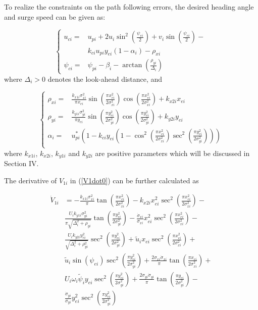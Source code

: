 \documentclass[conference,letterpaper,10.5pt]{IEEEtran}
\begin{document}
To realize the constraints on the path following errors, the desired heading angle and surge speed can be given as:

\begin{equation}\label{guidance law 1}
	\left\{
	\begin{aligned}
		u_{ci}=&u_{pi}+2u_i\sin^2(\frac{\psi_{ei}}{2})+v_i\sin(\frac{\psi_{ei}}{2})-\\
		&k_{ci}u_{pi}y_{ei}(1-\alpha_i)-\rho_{xi}\\
		\psi_{ci}=&\psi_{pi}-\beta_i-\arctan(\frac{\rho_{yi}}{\Delta_i})
	\end{aligned}
	\right.
\end{equation}
where $\Delta_i>0$ denotes the look-ahead distance, and 

\begin{equation}
	\left\{
	\begin{aligned}
		\rho_{xi}=&\frac{k_{x1i}\sigma^2_{xi}}{\pi x_{ei}}\sin(\frac{\pi x^2_{ei}}{2\sigma^2_{xi}})\cos(\frac{\pi x^2_{ei}}{2\sigma^2_{xi}})+k_{x2i}x_{ei}\\
		\rho_{yi}=&\frac{k_{y1i}\sigma^2_{yi}}{\pi y_{ei}}\sin(\frac{\pi y^2_{ei}}{2\sigma^2_{yi}})\cos(\frac{\pi y^2_{ei}}{2\sigma^2_{yi}})+k_{y2i}y_{ei}\\
		\alpha_i=&u^*_{pi}\left(1-k_{ci}y_{ei}\left(1-\cos^2(\frac{\pi x^2_{ei}}{2\sigma^2_{xi}})\sec^2(\frac{\pi y^2_{ei}}{2\sigma^2_{yi}})\right)\right)\\
	\end{aligned}
	\right.
\end{equation}
where $k_{x1i}$, $k_{x2i}$, $k_{y1i}$ and $k_{y2i}$ are positive parameters which will be discussed in Section IV.

The derivative of $V_{1i}$ in (\ref{V1dot0}) can be further calculated as

\begin{equation}\label{V1dot}
	\begin{aligned}
		\dot{V}_{1i}&=-\frac{k_{x1i}\sigma^2_{xi}}{\pi}\tan(\frac{\pi x^2_{ei}}{2\sigma^2_{xi}})-k_{x2i}x^2_{ei}\sec^2(\frac{\pi x^2_{ei}}{2\sigma^2_{xi}})-\\
		&\frac{U_ik_{y1i}\sigma^2_{yi}}{\pi\sqrt{\Delta^2_i+\rho_{yi}}}\tan(\frac{\pi y^2_{ei}}{2\sigma^2_{yi}})-\frac{\dot{\sigma}_{xi}}{\sigma_{xi}}x^2_{ei}\sec^2(\frac{\pi x^2_{ei}}{2\sigma^2_{xi}})-\\
		&\frac{U_ik_{y2i}y^2_{ei}}{\sqrt{\Delta^2_i+\rho^2_{yi}}}\sec^2(\frac{\pi y^2_{ei}}{2\sigma^2_{yi}})+\tilde{u}_ix_{ei}\sec^2(\frac{\pi x^2_{ei}}{2\sigma^2_{xi}})+\\
		&\tilde{u}_i\sin(\psi_{ei})\sec^2(\frac{\pi y^2_{ei}}{2\sigma^2_{yi}})+\frac{2\sigma_{xi}\dot{\sigma}_{xi}}{\pi}\tan(\frac{\pi x_{ei}}{2\sigma^2_{xi}})+\\
		&U_i\omega_i\tilde{\psi}_iy_{ei}\sec^2(\frac{\pi y^2_{ei}}{2\sigma^2_{yi}})+\frac{2\sigma_{yi}\dot{\sigma}_{yi}}{\pi}\tan(\frac{\pi y_{ei}}{2\sigma^2_{yi}})-\\
		&\frac{\dot{\sigma}_{yi}}{\sigma_{yi}}y^2_{ei}\sec^2(\frac{\pi y^2_{ei}}{2\sigma^2_{yi}})
	\end{aligned}
\end{equation}
\end{document}

